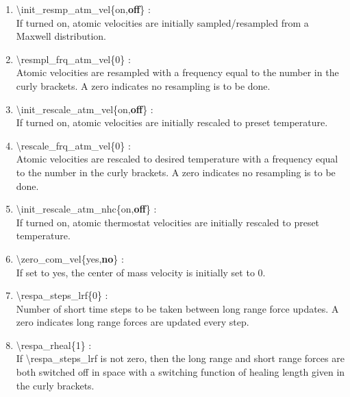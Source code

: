 \documentclass[12pt,titlepage]{article}
\begin{document}
\begin{enumerate}
 \vspace{0.15in}
 \item   \textbackslash{}init\_resmp\_atm\_vel\{on,{\bf off}\} : \\
     If turned on, atomic velocities are initially sampled/resampled from a 
     Maxwell distribution.


 \vspace{0.15in}
 \item   \textbackslash{}resmpl\_frq\_atm\_vel\{0\} : \\
     Atomic velocities are resampled with a frequency equal to the number 
     in the curly brackets.  A zero indicates no resampling is to be done.


 \vspace{0.15in}
 \item   \textbackslash{}init\_rescale\_atm\_vel\{on,{\bf off}\} : \\
    If turned on, atomic velocities are initially rescaled to preset 
    temperature.

 \vspace{0.15in}
 \item   \textbackslash{}rescale\_frq\_atm\_vel\{0\} : \\
    Atomic velocities are rescaled to desired temperature
    with a frequency equal to the number in the
    curly brackets.  A zero indicates no resampling is to be done.

 \vspace{0.15in} 
 \item   \textbackslash{}init\_rescale\_atm\_nhc\{on,{\bf off}\} : \\
    If turned on, atomic thermostat velocities are initially rescaled to 
    preset temperature.

 \vspace{0.15in} 
 \item   \textbackslash{}zero\_com\_vel\{yes,{\bf no}\} : \\
    If set to yes, the center of mass velocity is initially set to 0.

 \vspace{0.15in} 
 \item   \textbackslash{}respa\_steps\_lrf\{0\} : \\
    Number of short time steps to be taken between long range force updates.
    A zero indicates long range forces are updated every step.

 \vspace{0.15in} 
 \item   \textbackslash{}respa\_rheal\{1\} : \\
    If \textbackslash{}respa\_steps\_lrf is not zero, then the long range 
    and short range forces are both switched off in space with a switching
    function of healing length given in the curly brackets.


\end{enumerate}
\end{document}
